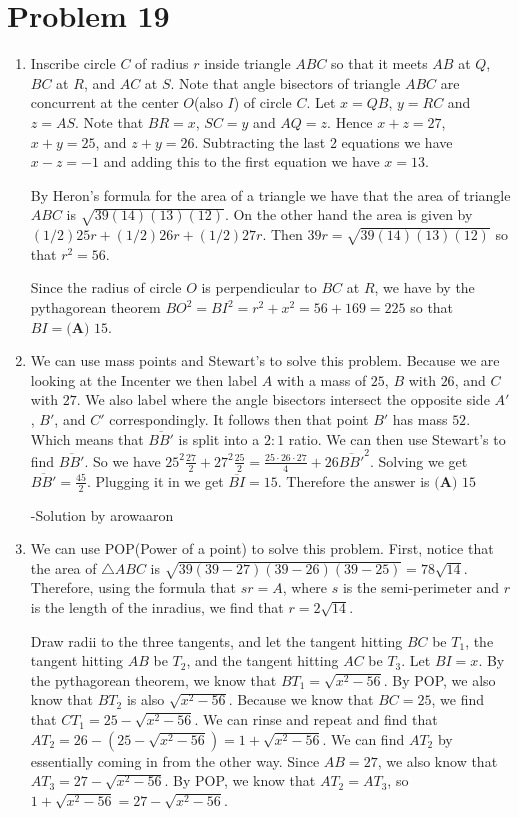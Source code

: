 \documentclass{article}%
\begin{document}
\section*{Problem 19}%
\label{sec:Problem19}%
\begin{enumerate}%
\item%
Inscribe circle $C$ of radius $r$ inside triangle $ABC$ so that it meets $AB$ at $Q$, $BC$ at $R$, and $AC$ at $S$. Note that angle bisectors of triangle $ABC$ are concurrent at the center $O$(also $I$) of circle $C$. Let $x=QB$, $y=RC$ and $z=AS$. Note that $BR=x$, $SC=y$ and $AQ=z$. Hence $x+z=27$, $x+y=25$, and $z+y=26$. Subtracting the last 2 equations we have $x-z=-1$ and adding this to the first equation we have $x=13$. 

By Heron's formula for the area of a triangle we have that the area of triangle $ABC$ is $\sqrt{39(14)(13)(12)}$. On the other hand the area is given by $(1/2)25r+(1/2)26r+(1/2)27r$.  Then $39r=\sqrt{39(14)(13)(12)}$ so that $r^2=56$.

Since the radius of circle $O$ is perpendicular to $BC$ at $R$, we have by the pythagorean theorem $BO^2=BI^2=r^2+x^2=56+169=225$ so that $BI=\boxed{\textbf{(A) } 15}$.

%
\item%
We can use mass points and Stewart's to solve this problem. Because we are looking at the Incenter we then label $A$ with a mass of $25$, $B$ with $26$, and $C$ with $27$. We also label where the angle bisectors intersect the opposite side $A'$, $B'$, and $C'$ correspondingly. It follows then that point $B'$ has mass $52$. Which means that $\overline{BB'}$ is split into a $2:1$ ratio. We can then use Stewart's to find $\overline{BB'}$. So we have $25^2\frac{27}{2} + 27^2\frac{25}{2} = \frac{25 \cdot 26 \cdot 27}{4} + 26\overline{BB'}^2$. Solving we get $\overline{BB'} = \frac{45}{2}$. Plugging it in we get $\overline{BI} = 15$. Therefore the answer is $\boxed{\textbf{(A) } 15}$

-Solution by arowaaron

%
\item%
We can use POP(Power of a point) to solve this problem. First, notice that the area of $\triangle ABC$ is $\sqrt{39(39 - 27)(39 - 26)(39 - 25)} = 78\sqrt{14}$. Therefore, using the formula that $sr = A$, where $s$ is the semi-perimeter and $r$ is the length of the inradius, we find that $r = 2\sqrt{14}$. 

Draw radii to the three tangents, and let the tangent hitting $BC$ be $T_1$, the tangent hitting $AB$ be $T_2$, and the tangent hitting $AC$ be $T_3$. Let $BI = x$. By the pythagorean theorem, we know that $BT_1 = \sqrt{x^2 - 56}$. By POP, we also know that $BT_2$ is also $\sqrt{x^2 - 56}$. Because we know that $BC = 25$, we find that $CT_1 = 25 - \sqrt{x^2 - 56}$. We can rinse and repeat and find that $AT_2 = 26 - (25 - \sqrt{x^2 - 56}) = 1 + \sqrt{x^2 - 56}$. We can find $AT_2$ by essentially coming in from the other way. Since $AB = 27$, we also know that $AT_3 = 27 - \sqrt{x^2 - 56}$. By POP, we know that $AT_2 = AT_3$, so $1 + \sqrt{x^2 - 56} = 27 - \sqrt{x^2 - 56}$.


\end{enumerate}
\end{document}
